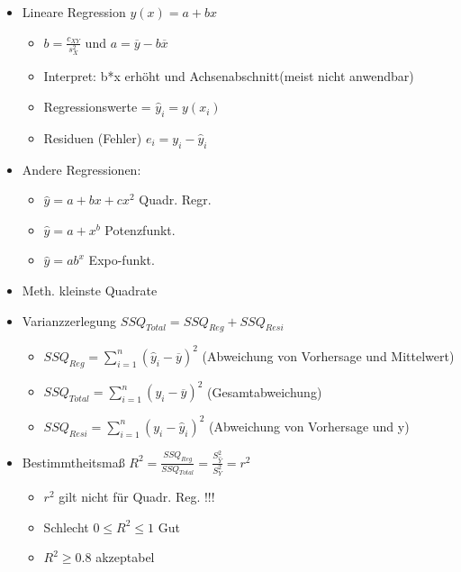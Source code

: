 \documentclass[a4paper]{article}
\begin{document}
\begin{landscape}
\begin{multicols}{4}
    \begin{itemize}[noitemsep,nolistsep,leftmargin=*]
        \item Lineare Regression $y(x) = a +bx$
        \begin{itemize}[noitemsep,nolistsep,leftmargin=*]
            \item $b = \frac{c_{XY}}{s_X^2}$ und $a = \overline{y} - b\overline{x}$
            \item Interpret: b*x erhöht und Achsenabschnitt(meist nicht anwendbar)
            \item Regressionswerte = $\widehat{y}_i = y(x_i)$
            \item Residuen (Fehler) $e_i = y_i - \widehat{y}_i$
        \end{itemize}
        \item Andere Regressionen:
        \begin{itemize}[noitemsep,nolistsep,leftmargin=*]
            \item $\hat{y} =  a+bx+cx^2$ Quadr. Regr.
            \item $\hat{y} =  a+x^b$ Potenzfunkt.
            \item $\hat{y} =  ab^x$ Expo-funkt.
        \end{itemize}
        \item Meth. kleinste Quadrate
        \item Varianzzerlegung $SSQ_{Total} = SSQ_{Reg} + SSQ_{Resi}$
        \begin{itemize}[noitemsep,nolistsep,leftmargin=*]
            \item $SSQ_{Reg} = \sum^n_{i=1} (\hat{y}_i-\overline{y})^2$ (Abweichung von Vorhersage und Mittelwert)
            \item $SSQ_{Total} = \sum^n_{i=1} (y_i-\overline{y})^2$ (Gesamtabweichung)
            \item $SSQ_{Resi} = \sum^n_{i=1} (y_i-\hat{y}_i)^2$ (Abweichung von Vorhersage und y)
        \end{itemize}
        \item Bestimmtheitsmaß $R^2 = \frac{SSQ_{Reg}}{SSQ_{Total}} = \frac{S^2_{\hat{Y}}}{S^2_Y} = r^2$
        \begin{itemize}[noitemsep,nolistsep,leftmargin=*]
            \item $r^2$ gilt nicht für Quadr. Reg. !!!
            \item Schlecht $0  \leq R^2  \leq 1$ Gut 
            \item $R^2  \geq 0.8$ akzeptabel
        \end{itemize}

\end{itemize}
\end{multicols}
\end{landscape}
\end{document}
